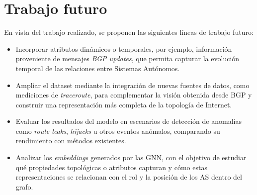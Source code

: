 \section{Trabajo futuro}

En vista del trabajo realizado, se proponen las siguientes líneas de trabajo futuro:
\begin{itemize}
    \item Incorporar atributos dinámicos o temporales, por ejemplo, información proveniente de mensajes \textit{BGP updates}, que permita capturar la evolución temporal de las relaciones entre Sistemas Autónomos.

    \item Ampliar el dataset mediante la integración de nuevas fuentes de datos, como mediciones de \textit{traceroute}, para complementar la visión obtenida desde BGP y construir una representación más completa de la topología de Internet.
    
    \item Evaluar los resultados del modelo en escenarios de detección de anomalías como \textit{route leaks}, \textit{hijacks} u otros eventos anómalos, comparando su rendimiento con métodos existentes.
    
    \item Analizar los \textit{embeddings} generados por las GNN, con el objetivo de estudiar qué propiedades topológicas o atributos capturan y cómo estas representaciones se relacionan con el rol y la posición de los AS dentro del grafo.
\end{itemize}






















